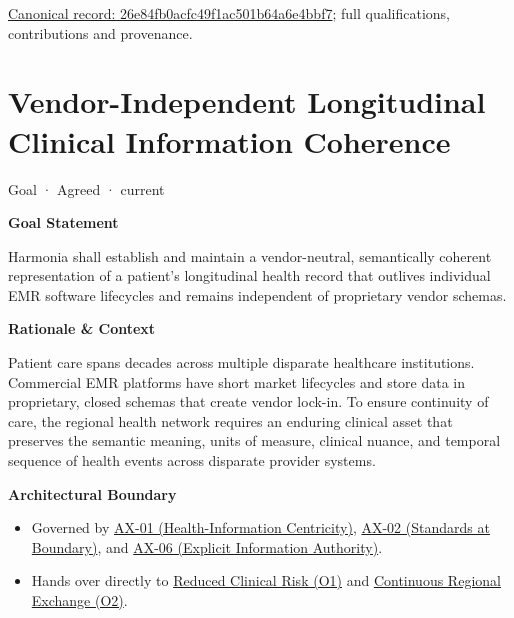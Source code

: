 {\footnotesize \href{../../../../continuum/motivation/goal/26e84fb0acfc49f1ac501b64a6e4bbf7.md}{Canonical record: 26e84fb0acfc49f1ac501b64a6e4bbf7}; full qualifications, contributions and provenance.}\par
\section{Vendor-Independent Longitudinal Clinical Information Coherence}

\label{element:905aca03c85748d79c3c065f6f16fc0a}
{\small Goal · Agreed · current}\par

\par\medskip\textbf{Goal Statement}\par


Harmonia shall establish and maintain a vendor-neutral, semantically coherent representation of a patient's longitudinal health record that outlives individual EMR software lifecycles and remains independent of proprietary vendor schemas.



\par\medskip\textbf{Rationale \& Context}\par


Patient care spans decades across multiple disparate healthcare institutions. Commercial EMR platforms have short market lifecycles and store data in proprietary, closed schemas that create vendor lock-in. To ensure continuity of care, the regional health network requires an enduring clinical asset that preserves the semantic meaning, units of measure, clinical nuance, and temporal sequence of health events across disparate provider systems.



\par\medskip\textbf{Architectural Boundary}\par


\begin{itemize}


\item Governed by \hyperref[element:e9bd61acaaea4577bc4086a5639e52c3]{AX-01 (Health-Information Centricity)}, \hyperref[element:eee8c3783d964d18a7f9dcea85fcd4cf]{AX-02 (Standards at Boundary)}, and \hyperref[element:952c3b6148ce4fce94b69f99a0c2fec7]{AX-06 (Explicit Information Authority)}.

\item Hands over directly to \href{\detokenize{../../../../../docs/markdown/01-motivation/goals-outcomes/business-outcomes.md}}{Reduced Clinical Risk (O1)} and \href{\detokenize{../../../../../docs/markdown/01-motivation/goals-outcomes/business-outcomes.md}}{Continuous Regional Exchange (O2)}.

\end{itemize}

